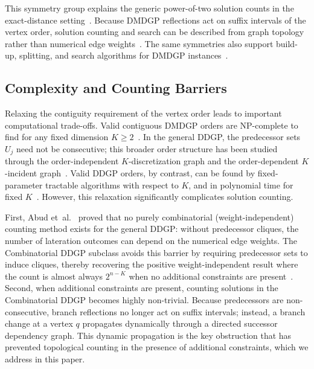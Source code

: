 \documentclass[11pt]{article}
\theoremstyle{plain}
\theoremstyle{definition}
\begin{document}
This symmetry group explains the generic power-of-two solution counts in the exact-distance setting~\cite{liberti2011number,liberti2014number}. Because DMDGP reflections act on suffix intervals of the vertex order, solution counting and search can be described from graph topology rather than numerical edge weights~\cite{lavor2021optimality}. The same symmetries also support build-up, splitting, and search algorithms for DMDGP instances~\cite{mucherino2012exploiting,goncalves2021new}. 

\subsection{Complexity and Counting Barriers}
Relaxing the contiguity requirement of the vertex order leads to important computational trade-offs. Valid contiguous DMDGP orders are NP-complete to find for any fixed dimension $K \ge 2$~\cite{cassioli2015discretization}. In the general DDGP, the predecessor sets $U_j$ need not be consecutive; this broader order structure has been studied through the order-independent $K$-discretization graph and the order-dependent $K$-incident graph~\cite{abud2018k}. Valid DDGP orders, by contrast, can be found by fixed-parameter tractable algorithms with respect to $K$, and in polynomial time for fixed $K$~\cite{cassioli2015discretization}. However, this relaxation significantly complicates solution counting. 

First, Abud et~al.~\cite{abud2024impossible} proved that no purely combinatorial (weight-independent) counting method exists for the general DDGP: without predecessor cliques, the number of lateration outcomes can depend on the numerical edge weights. The Combinatorial DDGP subclass avoids this barrier by requiring predecessor sets to induce cliques, thereby recovering the positive weight-independent result where the count is almost always $2^{n-K}$ when no additional constraints are present~\cite{abud2024impossible}. Second, when additional constraints are present, counting solutions in the Combinatorial DDGP becomes highly non-trivial. Because predecessors are non-consecutive, branch reflections no longer act on suffix intervals; instead, a branch change at a vertex $q$ propagates dynamically through a directed successor dependency graph. This dynamic propagation is the key obstruction that has prevented topological counting in the presence of additional constraints, which we address in this paper.
\end{document}
